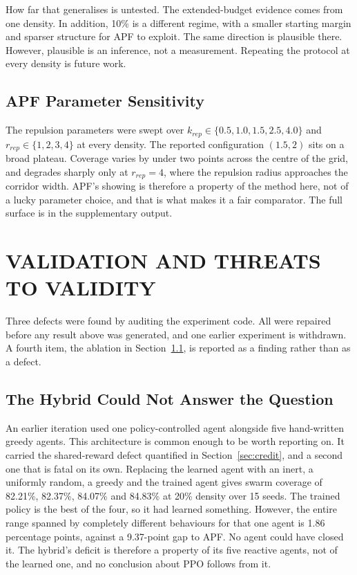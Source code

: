 \documentclass[a4paper, 10pt, conference]{ieeeconf}
\begin{document}
How far that generalises is untested. The extended-budget evidence
comes from one density. In addition, 10\% is a different regime, with
a smaller starting margin and sparser structure for APF to exploit.
The same direction is plausible there. However, plausible is an
inference, not a measurement. Repeating the protocol at every density
is future work.

\subsection{APF Parameter Sensitivity}\label{sec:sweep}

The repulsion parameters were swept over $k_{rep} \in \{0.5, 1.0,
1.5, 2.5, 4.0\}$ and $r_{rep} \in \{1,2,3,4\}$ at every density. The reported configuration $(1.5, 2)$ sits on a broad plateau. Coverage varies by under two points across the centre of the grid, and degrades sharply only at $r_{rep}=4$, where the repulsion radius approaches the corridor width. APF's showing is therefore a property of the method here, not of a lucky parameter choice, and that is what makes it a fair comparator. The full surface is in the supplementary output.

\section{VALIDATION AND THREATS TO VALIDITY}\label{sec:validity}

Three defects were found by auditing the experiment code. All were
repaired before any result above was generated, and one earlier
experiment is withdrawn. A fourth item, the ablation in
Section~\ref{sec:hybrid_ablation}, is reported as a finding rather
than as a defect.

\subsection{The Hybrid Could Not Answer the Question}
\label{sec:hybrid_ablation}

An earlier iteration used one policy-controlled agent alongside five
hand-written greedy agents. This architecture is common enough to be
worth reporting on. It carried the shared-reward defect quantified in
Section~\ref{sec:credit}, and a second one that is fatal on its own.
Replacing the learned agent with an inert, a uniformly random, a
greedy and the trained agent gives swarm coverage of 82.21\%, 82.37\%,
84.07\% and 84.83\% at 20\% density over 15 seeds. The trained policy
is the best of the four, so it had learned something. However, the
entire range spanned by completely different behaviours for that one
agent is 1.86 percentage points, against a 9.37-point gap to APF. No
agent could have closed it. The hybrid's deficit is therefore a
property of its five reactive agents, not of the learned one, and no
conclusion about PPO follows from it.
\end{document}
